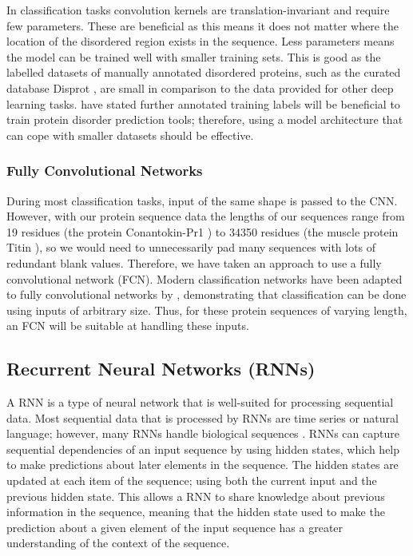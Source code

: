 \documentclass{l4proj}
\begin{document}
In classification tasks convolution kernels are translation-invariant and require few parameters. These are beneficial as this means it does not matter where the location of the disordered region exists in the sequence. Less parameters means the model can be trained well with smaller training sets. This is good as the labelled datasets of manually annotated disordered proteins, such as the curated database Disprot \citep{disprot}, are small in comparison to the data provided for other deep learning tasks. \cite{Jones:15} have stated further annotated training labels will be beneficial to train protein disorder prediction tools; therefore, using a model architecture that can cope with smaller datasets should be effective. \\

\subsubsection{Fully Convolutional Networks \newline}
\label{chap:background sec:FCN}

During most classification tasks, input of the same shape is passed to the CNN. However, with our protein sequence data the lengths of our sequences range from 19 residues (the protein Conantokin-Pr1 \citep{uniprot:22}) to 34350 residues (the muscle protein Titin \citep{uniprot:22}), so we would need to unnecessarily pad many sequences with lots of redundant blank values. Therefore, we have taken an approach to use a fully convolutional network (FCN). Modern classification networks have been adapted to fully convolutional networks by \cite{fcn_seg}, demonstrating that classification can be done using inputs of arbitrary size. Thus, for these protein sequences of varying length, an FCN will be suitable at handling these inputs. 

\subsection{Recurrent Neural Networks (RNNs)}
\label{chap:background sec:RNN}

A RNN is a type of neural network that is well-suited for processing sequential data. Most sequential data that is processed by RNNs are time series or natural language; however, many RNNs handle biological sequences \citep{Hawkins:05}. RNNs can capture sequential dependencies of an input sequence by using hidden states, which help to make predictions about later elements in the sequence. The hidden states are updated at each item of the sequence; using both the current input and the previous hidden state. This allows a RNN to share knowledge about previous information in the sequence, meaning that the hidden state used to make the prediction about a given element of the input sequence has a greater understanding of the context of the sequence.
\end{document}
